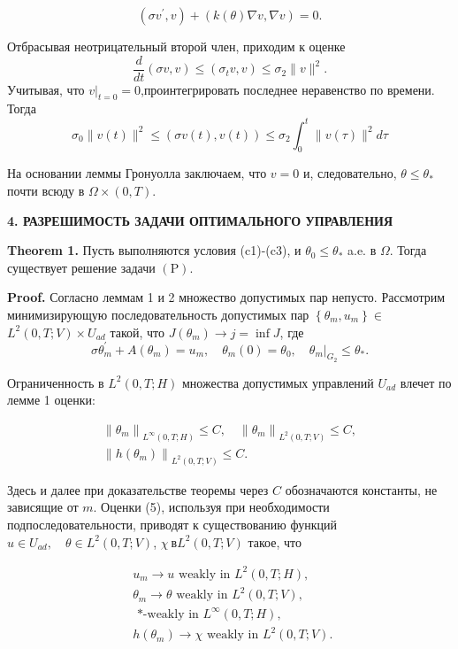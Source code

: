 \documentclass[10pt]{article}
\begin{document}
\[
\left(\sigma v^{\prime}, v\right)+(k(\theta) \nabla v, \nabla v)=0 .
\]

Отбрасывая неотрицательный второй член, приходим к оценке
\[
\frac{d}{d t}(\sigma v, v) \leq\left(\sigma_{t} v, v\right) \leq \sigma_{2}\|v\|^{2} .
\]
Учитывая, что $\left.v\right|_{t=0}=0$,проинтегрировать последнее неравенство по времени.
Тогда
\[
\sigma_{0}\|v(t)\|^{2} \leq(\sigma v(t), v(t)) \leq \sigma_{2} \int_{0}^{t}\|v(\tau)\|^{2} d \tau
\]

На основании леммы Гронуолла заключаем,
что $v=0$ и, следовательно, $\theta \leq \theta_{*}$ почти всюду в $\Omega\times(0,T)$.

\textbf{4. РАЗРЕШИМОСТЬ ЗАДАЧИ ОПТИМАЛЬНОГО УПРАВЛЕНИЯ}

\textbf{Theorem 1.}
Пусть выполняются условия (c1)-(c3), и $\theta_{0} \leq \theta_{*}$ a.e. в $\Omega$.
Тогда существует решение задачи $(\mathrm{P})$.

\textbf{Proof.}
Согласно леммам 1 и 2 множество допустимых пар непусто.
Рассмотрим минимизирующую последовательность допустимых
пар $\left\{\theta_{m}, u_{m}\right\} \in$ $L^{2}(0, T ; V) \times U_{a d}$
такой, что $J\left(\theta_{m}\right) \rightarrow j=\inf J$, где
\[
\sigma \theta_{m}^{\prime}+A\left(\theta_{m}\right)=u_{m},
\quad \theta_{m}(0)=\theta_{0},\left.\quad \theta_{m}\right|_{G_{2}} \leq \theta_{*} .
\]

Ограниченность в $L^{2}(0, T ; H)$ множества допустимых управлений $U_{a d}$ влечет по лемме 1 оценки:

\[
\begin{gathered}
\left\|\theta_{m}\right\|_{L^{\infty}(0, T ; H)} \leq C,
\quad\left\|\theta_{m}\right\|_{L^{2}(0, T ; V)} \leq C, \\
\left\|h\left(\theta_{m}\right)\right\|_{L^{2}(0, T ; V)} \leq C .
\end{gathered}
\]

Здесь и далее при доказательстве теоремы через $C$ обозначаются константы, не зависящие от $m$.
Оценки (5), используя при необходимости подпоследовательности,
приводят к существованию функций
$u \in U_{a d}, \quad \theta \in L^{2}(0, T ; V)$, $\chi \ в L^{2}(0, T ; V)$
такое, что

\[
\begin{aligned}
& u_{m} \rightarrow u \text { weakly in } L^{2}(0, T ; H), \\
& \theta_{m} \rightarrow \theta \text { weakly in } L^{2}(0, T ; V) \text {, } \\
& \text { *-weakly in } L^{\infty}(0, T ; H) \text {, } \\
& h\left(\theta_{m}\right) \rightarrow \chi \text { weakly in } L^{2}(0, T ; V) \text {. }
\end{aligned}
\]
\end{document}
